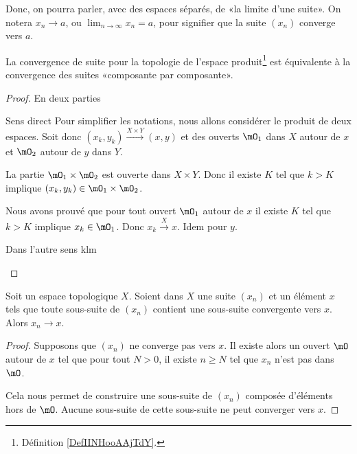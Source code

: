 \begin{normaltext}
  Donc, on pourra parler, avec des espaces séparés, de «la limite d'une suite». On notera \( x_n\to a\), ou \(\lim_{n\to \infty} x_n = a \), pour signifier que la suite \( (x_n) \) converge vers \( a \). 
\end{normaltext}

\begin{proposition}      \label{PROPooNRRIooCPesgO}
    La convergence de suite pour la topologie de l'espace produit\footnote{Définition \ref{DefIINHooAAjTdY}.} est équivalente à la convergence des suites «composante par composante».
\end{proposition}

\begin{proof}
    En deux parties
    \begin{subproof}
        \item[Sens direct]
            Pour simplifier les notations, nous allons considérer le produit de deux espaces. Soit donc \( (x_k,y_k)\stackrel{X\times Y}{\longrightarrow}(x,y)\) et des ouverts \( \mO_1\) dans \( X\) autour de \( x\) et \( \mO_2\) autour de \( y\) dans \( Y\). 

            La partie \( \mO_1\times \mO_2\) est ouverte dans \( X\times Y\). Donc il existe \( K\) tel que \( k>K\) implique \( (x_k,y_k)\in \mO_1\times \mO_2\).

            Nous avons prouvé que pour tout ouvert \( \mO_1\) autour de \( x\) il existe \( K\) tel que \( k>K\) implique \( x_k\in \mO_1\). Donc \( x_k\stackrel{X}{\longrightarrow}x\). Idem pour \( y\).

        \item[Dans l'autre sens]
            klm
    \end{subproof}
\end{proof}

\begin{lemma}        \label{LEMooSJKMooKSiEGq}
    Soit un espace topologique \( X\). Soient dans \( X\) une suite \( (x_n)\) et un élément \( x\) tels que toute sous-suite de \( (x_n)\) contient une sous-suite convergente vers \( x\). Alors \( x_n\to x\).
\end{lemma}

\begin{proof}
    Supposons que \( (x_n)\) ne converge pas vers \( x\). Il existe alors un ouvert \( \mO\) autour de \( x\) tel que pour tout \( N>0\), il existe \( n\geq N\) tel que \( x_n\) n'est pas dans \( \mO\).

    Cela nous permet de construire une sous-suite de \( (x_n)\) composée d'éléments hors de \( \mO\). Aucune sous-suite de cette sous-suite ne peut converger vers \( x\).
\end{proof}

